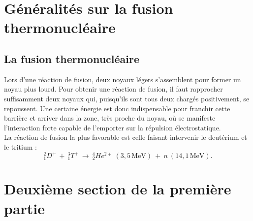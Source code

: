 \section{Généralités sur la fusion thermonucléaire}
\subsection{La fusion thermonucléaire}
Lors d'une réaction de fusion, deux noyaux légers s'assemblent pour former un noyau plus lourd. Pour obtenir une réaction de fusion, il faut rapprocher suffisamment deux noyaux qui, puisqu'ils sont tous deux chargés positivement, se repoussent. Une certaine énergie est donc indispensable pour franchir cette barrière et arriver dans la zone, très proche du noyau, où se manifeste l'interaction forte capable de l'emporter sur la répulsion électrostatique.
\\ %
La réaction de fusion la plus favorable est celle faisant intervenir le deutérium et le tritium : $$_{1}^{2}D^{+}~+~_{1}^{3}T^{+}~\rightarrow ~_{2}^{4}He^{2+}~(3,5\,\textrm{MeV})~+~n~(14,1\,\textrm{MeV}).$$
\noindent %
\lipsum[1]
\section{Deuxième section de la première partie}
\lipsum[2]